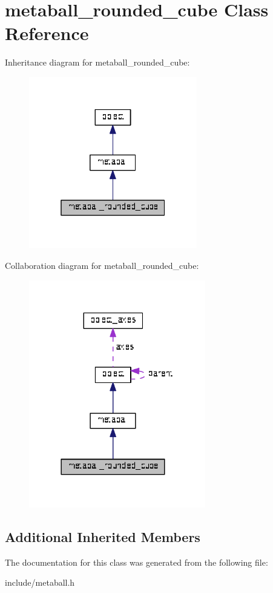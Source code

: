 \hypertarget{classmetaball__rounded__cube}{}\section{metaball\+\_\+rounded\+\_\+cube Class Reference}
\label{classmetaball__rounded__cube}


Inheritance diagram for metaball\+\_\+rounded\+\_\+cube\+:\nopagebreak
\begin{figure}[H]
\begin{center}
\leavevmode
\includegraphics[width=208pt]{classmetaball__rounded__cube__inherit__graph}
\end{center}
\end{figure}


Collaboration diagram for metaball\+\_\+rounded\+\_\+cube\+:\nopagebreak
\begin{figure}[H]
\begin{center}
\leavevmode
\includegraphics[width=218pt]{classmetaball__rounded__cube__coll__graph}
\end{center}
\end{figure}
\subsection*{Additional Inherited Members}


The documentation for this class was generated from the following file\+:\begin{DoxyCompactItemize}
\item 
include/metaball.\+h\end{DoxyCompactItemize}
